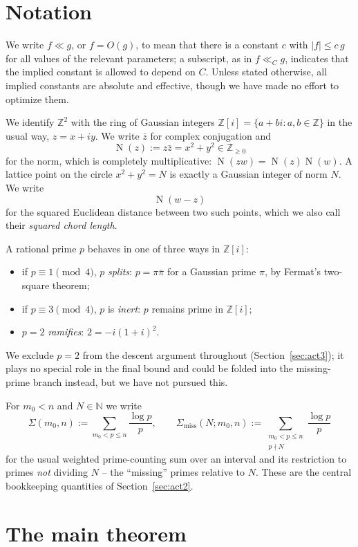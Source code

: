 \documentclass[11pt]{amsart}
\theoremstyle{definition}
\theoremstyle{remark}
\newcommand{\Z}{\mathbb{Z}}
\newcommand{\N}{\mathbb{N}}
\newcommand{\Zi}{\mathbb{Z}[i]}
\DeclareMathOperator{\Nm}{N}
\newcommand{\nm}[1]{\Nm(#1)}
\begin{document}
\section{Notation}\label{sec:notation}

We write $f \ll g$, or $f=O(g)$, to mean that there is a constant $c$ with $|f|\le c\,g$ for all values of the relevant parameters; a subscript, as in $f \ll_C g$, indicates that the implied constant is allowed to depend on $C$. Unless stated otherwise, all implied constants are absolute and effective, though we have made no effort to optimize them.

We identify $\Z^2$ with the ring of Gaussian integers $\Zi = \{a+bi : a,b\in\Z\}$ in the usual way, $z=x+iy$. We write $\bar z$ for complex conjugation and
\[
\nm{z} := z\bar z = x^2+y^2 \in \Z_{\ge 0}
\]
for the norm, which is completely multiplicative: $\nm{zw} = \nm{z}\nm{w}$. A lattice point on the circle $x^2+y^2=N$ is exactly a Gaussian integer of norm $N$. We write
\[
\nm{w-z}
\]
for the squared Euclidean distance between two such points, which we also call their \emph{squared chord length}.

A rational prime $p$ behaves in one of three ways in $\Z[i]$:
\begin{itemize}
\item if $p\equiv 1\pmod 4$, $p$ \emph{splits}: $p=\pi\bar\pi$ for a Gaussian prime $\pi$, by Fermat's two-square theorem;
\item if $p\equiv 3\pmod 4$, $p$ is \emph{inert}: $p$ remains prime in $\Z[i]$;
\item $p=2$ \emph{ramifies}: $2=-i(1+i)^2$.
\end{itemize}
We exclude $p=2$ from the descent argument throughout (Section~\ref{sec:act3}); it plays no special role in the final bound and could be folded into the missing-prime branch instead, but we have not pursued this.

For $m_0 < n$ and $N\in\N$ we write
\[
\Sigma(m_0,n) := \sum_{m_0 < p \le n} \frac{\log p}{p}, \qquad
\Sigma_{\mathrm{miss}}(N; m_0,n) := \sum_{\substack{m_0<p\le n\\ p\nmid N}} \frac{\log p}{p}
\]
for the usual weighted prime-counting sum over an interval and its restriction to primes \emph{not} dividing $N$ -- the ``missing'' primes relative to $N$. These are the central bookkeeping quantities of Section~\ref{sec:act2}.

\section{The main theorem}\label{sec:main}
\end{document}
